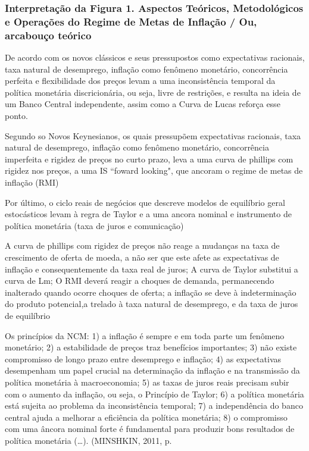 \documentclass[report]{uftex}
\begin{document}
\subsubsection{Interpretação da Figura 1. Aspectos Teóricos, Metodológicos e Operações do Regime de Metas de Inflação / Ou, arcabouço teórico}

{\footnotesize De acordo com os novos clássicos e seus pressupostos como expectativas racionais, taxa natural de desemprego, inflação como fenômeno monetário, concorrência perfeita e flexibilidade dos preços levam a uma inconsistência temporal da política monetária discricionária, ou seja, livre de restrições, e resulta na ideia de um Banco Central independente, assim como a Curva de Lucas reforça esse ponto.

Segundo so Novos Keynesianos, os quais pressupõem expectativas racionais, taxa natural de desemprego, inflação como fenômeno monetário, concorrência imperfeita e rigidez de preços no curto prazo, leva a uma curva de phillips com rigidez nos preços, a uma IS ``foward looking", que ancoram o regime de metas de inflação (RMI)

Por último, o ciclo reais de negócios que descreve modelos de equilíbrio geral estocásticos levam à regra de Taylor e a uma ancora nominal e instrumento de política monetária (taxa de juros e comunicação)

A curva de phillips com rigidez de preços não reage a mudanças na taxa de crescimento de oferta de moeda, a não ser que este afete as expectativas de inflação e consequentemente da taxa real de juros; A curva de Taylor substitui a curva de Lm; O RMI deverá reagir a choques de demanda, permanecendo inalterado quando ocorre choques de oferta; a inflação se deve à indeterminação do produto potencial,a trelado à taxa natural de desemprego, e da taxa de juros de equilíbrio

Os princípios da NCM: 1) a inflação é sempre e em toda parte um fenômeno monetário; 2) a estabilidade de preços traz benefícios importantes; 3) não existe compromisso de longo prazo entre desemprego e inflação; 4) as expectativas desempenham um papel crucial na determinação da inflação e na transmissão da política monetária à macroeconomia; 5) as taxas de juros reais precisam subir com o aumento da inflação, ou seja, o Princípio de Taylor; 6) a política monetária está sujeita ao problema da inconsistência temporal; 7) a independência do banco central ajuda a melhorar a eficiência da política monetária; 8) o compromisso com uma âncora nominal forte é fundamental para produzir bons resultados de política monetária (…). (MINSHKIN, 2011, p.} 
\end{document}
